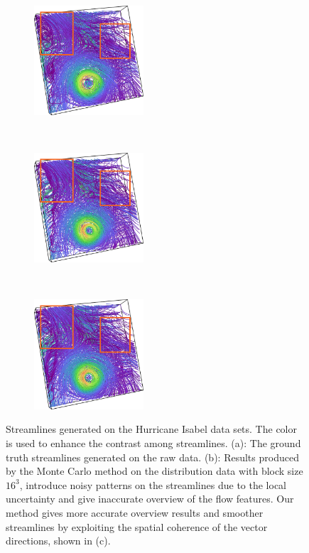 \begin{figure}[!htbp]
  \centering
  \begin{subfigure}[!htbp]{0.32\textwidth}
    \centering
    \includegraphics[width=1.6in]{../figures/isabel_gt.eps}
    \caption{}
  \end{subfigure}~
  \begin{subfigure}[!htbp]{0.32\textwidth}
    \centering
    \includegraphics[width=1.6in]{../figures/isabel_mc.eps}
    \caption{}
  \end{subfigure}~
  \begin{subfigure}[!htbp]{0.32\textwidth}
    \centering
    \includegraphics[width=1.6in]{../figures/isabel_smc.eps}
    \caption{}
  \end{subfigure}

  \caption{Streamlines generated on the Hurricane Isabel data sets. The color is used to enhance the contrast among streamlines. (a): The ground truth streamlines generated on the raw data. (b): Results produced by the Monte Carlo method on the distribution data with block size $16^3$, introduce noisy patterns on the streamlines due to the local uncertainty and give inaccurate overview of the flow features. Our method gives more accurate overview results and smoother streamlines by exploiting the spatial coherence of the vector directions, shown in (c).}
  \label{data_overview}
\end{figure}

